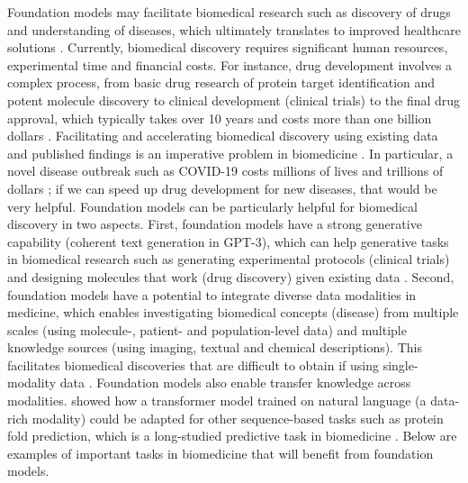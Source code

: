 Foundation models may facilitate biomedical research such as discovery of drugs and understanding of diseases, which ultimately translates to improved healthcare solutions \citep{hanney2015long}. Currently, biomedical discovery requires significant human resources, experimental time and financial costs. For instance, drug development involves a complex process,
from basic drug research of protein target identification and potent molecule discovery to clinical development (\eg clinical trials) to the final drug approval, which typically takes over 10 years and costs more than one billion dollars \citep{wouters2020estimated}.
Facilitating and accelerating biomedical discovery using existing data and published findings is an imperative problem in biomedicine \citep{yu2018artificial}. In particular, a novel disease outbreak such as COVID-19 costs millions of lives and trillions of dollars  \citep{lalmuanawma2020applications,mckibbin2020economic}; if we can speed up drug development for new diseases, that would be very helpful.
Foundation models can be particularly helpful for biomedical discovery in two aspects. First, foundation models have a strong generative capability (\eg coherent text generation in GPT-3), which can help generative tasks in biomedical research such as generating experimental protocols (clinical trials) and designing molecules that work (drug discovery) given existing data \citep{kadurin2017drugan,harrer2019artificial}. 
Second, foundation models have a potential to integrate diverse data modalities in medicine, which enables investigating biomedical concepts (\eg disease) from multiple scales (using molecule-, patient- and population-level data) and multiple knowledge sources (using imaging, textual and chemical descriptions). This facilitates biomedical discoveries that are difficult to obtain if using single-modality data \citep{lanckriet2004statistical,aerts2006gene,kong2011integrative,ribeiro2012classification,wang2014drug,wang2015kernel,ruiz2020identification,wu2021babel}.
Foundation models also enable transfer knowledge across modalities. \citet{DBLP:journals/corr/abs-2103-05247} showed how a transformer model trained on natural language (a data-rich modality) could be adapted for other sequence-based tasks such as protein fold prediction, which is a long-studied predictive task in biomedicine \citep{jumper2020high}.
Below are examples of important tasks in biomedicine that will benefit from foundation models.


